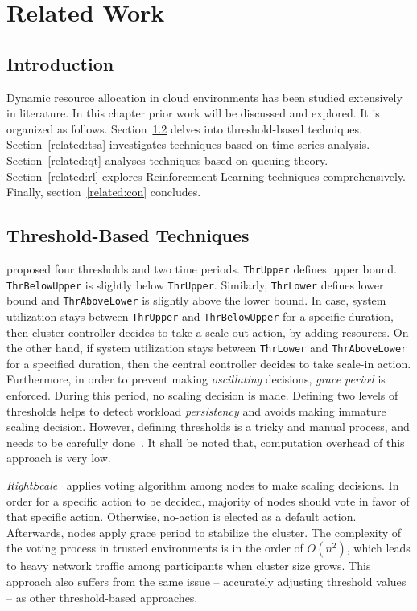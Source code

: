 \chapter{Related Work}
\label{related}
\section{Introduction}

Dynamic resource allocation in cloud environments has been studied extensively in literature. In this chapter prior work will be discussed and explored. It is organized as follows. Section~\ref{related:thb} delves into threshold-based techniques. Section~\ref{related:tsa} investigates techniques based on time-series analysis. Section~\ref{related:qt} analyses techniques based on queuing theory. Section~\ref{related:rl} explores Reinforcement Learning techniques comprehensively. Finally, section~\ref{related:con} concludes.

\section{Threshold-Based Techniques}
\label{related:thb}

\textcite{Hasan2012IntegratedAA} proposed four thresholds and two time periods. \lstinline$ThrUpper$ defines upper bound. \lstinline$ThrBelowUpper$ is slightly below \lstinline$ThrUpper$. Similarly, \lstinline$ThrLower$ defines lower bound and \lstinline$ThrAboveLower$ is slightly above the lower bound. In case, system utilization stays between \lstinline$ThrUpper$ and \lstinline$ThrBelowUpper$ for a specific duration, then cluster controller decides to take a scale-out action, by adding resources. On the other hand, if system utilization stays between \lstinline$ThrLower$ and \lstinline$ThrAboveLower$ for a specified duration, then the central controller decides to take scale-in action. Furthermore, in order to prevent making \emph{oscillating} decisions, \emph{grace period} is enforced. During this period, no scaling decision is made. Defining two levels of thresholds helps to detect workload \emph{persistency} and avoids making immature scaling decision. However, defining thresholds is a tricky and manual process, and needs to be carefully done~\cite{Dutreilh2010}. It shall be noted that, computation overhead of this approach is very low.

\emph{RightScale}~\cite{RightScale} applies voting algorithm among nodes to make scaling decisions. In order for a specific action to be decided, majority of nodes should vote in favor of that specific action. Otherwise, no-action is elected as a default action. Afterwards, nodes apply grace period to stabilize the cluster. The complexity of the voting process in trusted environments is in the order of $O(n^2)$, which leads to heavy network traffic among participants when cluster size grows. This approach also suffers from the same issue -- accurately adjusting threshold values -- as other threshold-based approaches.

